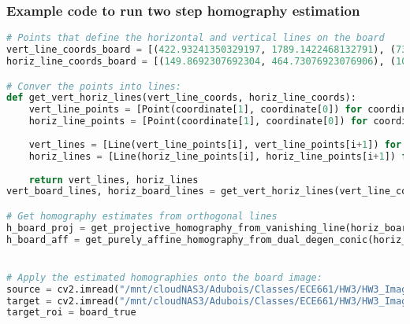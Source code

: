 \documentclass{article}
\begin{document}
\subsubsection{Example code to run two step homography estimation}
\begin{lstlisting}[language=Python]
# Points that define the horizontal and vertical lines on the board
vert_line_coords_board = [(422.93241350329197, 1789.1422468132791), (73.97597702759504, 427.6070177896065), (1356.8447261521223, 1954.5435635243032), (1223.71683709203, 141.18034738758934), (487.6557641126207, 1609.6213055049727), (215.34871830788614, 451.81208852780514), (1129.0901386748844, 1756.8688191623478), (957.6375542793107, 280.35950413223145), (793.8538858617717, 1712.9637223974764), (544.0116145683962, 374.965443074276), (1051.9554057929447, 1807.945081732148), (847.5390020074556, 304.761829652997)]
horiz_line_coords_board = [(149.8692307692304, 464.73076923076906), (1078.3167832167833, 255.27622377622356), (423.77132867132855, 1594.5769230769229), (1213.253846153846, 1683.1923076923076), (73.18058968058949, 425.28308178308134), (1223.5631800631795, 142.23639873639831), (426.9889434889433, 1798.0594945594944), (1356.999473499473, 1953.7351702351702), (203.86923076923063, 744.674825174825), (1108.148951048951, 621.8216783216781), (336.79230769230753, 1244.1433566433566), (1172.5965034965034, 1254.2132867132866)]

# Conver the points into lines:
def get_vert_horiz_lines(vert_line_coords, horiz_line_coords):
    vert_line_points = [Point(coordinate[1], coordinate[0]) for coordinate in vert_line_coords]
    horiz_line_points = [Point(coordinate[1], coordinate[0]) for coordinate in horiz_line_coords]
    
    vert_lines = [Line(vert_line_points[i], vert_line_points[i+1]) for i in range(0, len(vert_line_points) - 1, 2)]
    horiz_lines = [Line(horiz_line_points[i], horiz_line_points[i+1]) for i in range(0, len(horiz_line_points) - 1, 2)]
    
    return vert_lines, horiz_lines
vert_board_lines, horiz_board_lines = get_vert_horiz_lines(vert_line_coords_board, horiz_line_coords_board)

# Get homography estimates from orthogonal lines
h_board_proj = get_projective_homography_from_vanishing_line(horiz_board_lines, vert_board_lines)
h_board_aff = get_purely_affine_homography_from_dual_degen_conic(horiz_board_lines, vert_board_lines)


# Apply the estimated homographies onto the board image:
source = cv2.imread("/mnt/cloudNAS3/Adubois/Classes/ECE661/HW3/HW3_Images/board_1.jpeg")
target = cv2.imread("/mnt/cloudNAS3/Adubois/Classes/ECE661/HW3/HW3_Images/board_1.jpeg")
target_roi = board_true


\end{lstlisting}
\end{document}
